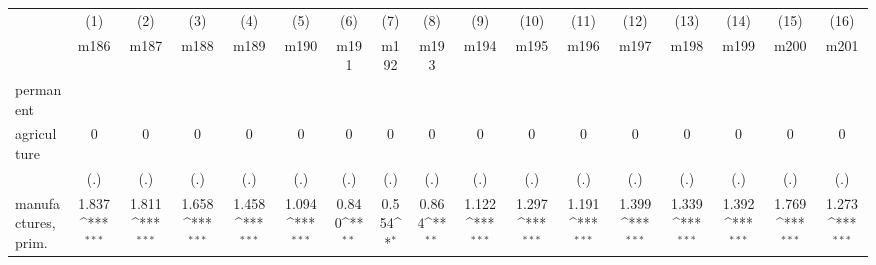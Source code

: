 {
\def\sym#1{\ifmmode^{#1}\else\(^{#1}\)\fi}
\begin{tabular}{l*{16}{c}}
\hline\hline
                    &\multicolumn{1}{c}{(1)}&\multicolumn{1}{c}{(2)}&\multicolumn{1}{c}{(3)}&\multicolumn{1}{c}{(4)}&\multicolumn{1}{c}{(5)}&\multicolumn{1}{c}{(6)}&\multicolumn{1}{c}{(7)}&\multicolumn{1}{c}{(8)}&\multicolumn{1}{c}{(9)}&\multicolumn{1}{c}{(10)}&\multicolumn{1}{c}{(11)}&\multicolumn{1}{c}{(12)}&\multicolumn{1}{c}{(13)}&\multicolumn{1}{c}{(14)}&\multicolumn{1}{c}{(15)}&\multicolumn{1}{c}{(16)}\\
                    &\multicolumn{1}{c}{m186}&\multicolumn{1}{c}{m187}&\multicolumn{1}{c}{m188}&\multicolumn{1}{c}{m189}&\multicolumn{1}{c}{m190}&\multicolumn{1}{c}{m191}&\multicolumn{1}{c}{m192}&\multicolumn{1}{c}{m193}&\multicolumn{1}{c}{m194}&\multicolumn{1}{c}{m195}&\multicolumn{1}{c}{m196}&\multicolumn{1}{c}{m197}&\multicolumn{1}{c}{m198}&\multicolumn{1}{c}{m199}&\multicolumn{1}{c}{m200}&\multicolumn{1}{c}{m201}\\
\hline
permanent           &                     &                     &                     &                     &                     &                     &                     &                     &                     &                     &                     &                     &                     &                     &                     &                     \\
agriculture         &           0         &           0         &           0         &           0         &           0         &           0         &           0         &           0         &           0         &           0         &           0         &           0         &           0         &           0         &           0         &           0         \\
                    &         (.)         &         (.)         &         (.)         &         (.)         &         (.)         &         (.)         &         (.)         &         (.)         &         (.)         &         (.)         &         (.)         &         (.)         &         (.)         &         (.)         &         (.)         &         (.)         \\
[1em]
manufactures, prim. &       1.837\sym{***}&       1.811\sym{***}&       1.658\sym{***}&       1.458\sym{***}&       1.094\sym{***}&       0.840\sym{**} &       0.554\sym{*}  &       0.864\sym{**} &       1.122\sym{***}&       1.297\sym{***}&       1.191\sym{***}&       1.399\sym{***}&       1.339\sym{***}&       1.392\sym{***}&       1.769\sym{***}&       1.273\sym{***}\\

\end{tabular}}
